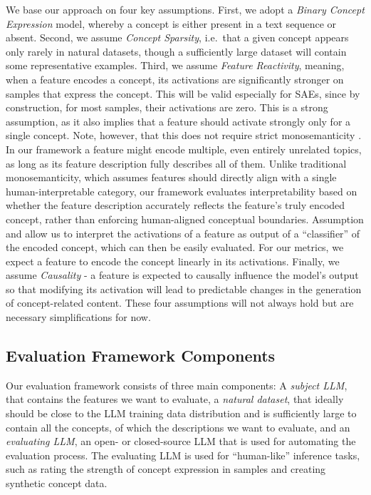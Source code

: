 We base our approach on four key assumptions. First, we adopt a  \textit{Binary Concept Expression} model, whereby a concept is either present in a text sequence or absent. Second, we assume  \textit{Concept Sparsity}, i.e.\ that a given concept appears only rarely in natural datasets, though a sufficiently large dataset will contain some representative examples.
Third, we assume  \textit{Feature Reactivity}, meaning, when a feature encodes a concept, its activations are significantly stronger on samples that express the concept.
This will be valid especially for SAEs, since by construction, for most samples, their activations are zero.
This is a strong assumption, as it also implies that a feature should activate strongly only for a single concept.
Note, however, that this does not require strict monosemanticity \cite{bricken2023monosemanticity}.
In our framework a feature might encode multiple, even entirely unrelated topics, as long as its feature description fully describes all of them. Unlike traditional monosemanticity, which assumes features should directly align with a single human-interpretable category, our framework evaluates interpretability based on whether the feature description accurately reflects the feature’s truly encoded concept, rather than enforcing human-aligned conceptual boundaries.
Assumption  and  allow us to interpret the activations of a feature as output of a ``classifier'' of the encoded concept, which can then be easily evaluated. For our metrics, we expect a feature to encode the concept linearly in its activations. Finally, we assume  \textit{Causality} - a feature is expected to causally influence the model’s output so that modifying its activation will lead to predictable changes in the generation of concept-related content. These four assumptions will not always hold but are necessary simplifications for now.


\subsection{Evaluation Framework Components}

Our evaluation framework consists of three main components: A \textit{subject LLM}, that contains the features we want to evaluate, a \textit{natural dataset}, that ideally should be close to the LLM training data distribution and is sufficiently large to contain all the concepts, of which the descriptions we want to evaluate, and an \textit{evaluating LLM}, an open- or closed-source LLM that is used for automating the evaluation process. The evaluating LLM is used for ``human-like'' inference tasks, such as rating the strength of concept expression in samples and creating synthetic concept data.


